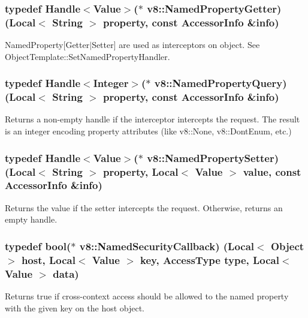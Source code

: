 \subsubsection[{Named\+Property\+Getter}]{\setlength{\rightskip}{0pt plus 5cm}typedef {\bf Handle}$<${\bf Value}$>$($\ast$ v8\+::\+Named\+Property\+Getter) ({\bf Local}$<$ {\bf String} $>$ property, const {\bf Accessor\+Info} \&info)}\label{namespacev8_ab9effde41da1c073eddbd4a11a62bd0b}
Named\+Property\mbox{[}Getter$\vert$\+Setter\mbox{]} are used as interceptors on object. See Object\+Template\+::\+Set\+Named\+Property\+Handler. \hypertarget{namespacev8_a0136e8102c101d9a39497f75daa9153b}{}
\subsubsection[{Named\+Property\+Query}]{\setlength{\rightskip}{0pt plus 5cm}typedef {\bf Handle}$<${\bf Integer}$>$($\ast$ v8\+::\+Named\+Property\+Query) ({\bf Local}$<$ {\bf String} $>$ property, const {\bf Accessor\+Info} \&info)}\label{namespacev8_a0136e8102c101d9a39497f75daa9153b}
Returns a non-\/empty handle if the interceptor intercepts the request. The result is an integer encoding property attributes (like v8\+::\+None, v8\+::\+Dont\+Enum, etc.) \hypertarget{namespacev8_a682b1fc46feab32605c4905612ffe870}{}
\subsubsection[{Named\+Property\+Setter}]{\setlength{\rightskip}{0pt plus 5cm}typedef {\bf Handle}$<${\bf Value}$>$($\ast$ v8\+::\+Named\+Property\+Setter) ({\bf Local}$<$ {\bf String} $>$ property, {\bf Local}$<$ {\bf Value} $>$ value, const {\bf Accessor\+Info} \&info)}\label{namespacev8_a682b1fc46feab32605c4905612ffe870}
Returns the value if the setter intercepts the request. Otherwise, returns an empty handle. \hypertarget{namespacev8_ab5cafda0c556bba990c660ce9c904e0d}{}
\subsubsection[{Named\+Security\+Callback}]{\setlength{\rightskip}{0pt plus 5cm}typedef bool($\ast$ v8\+::\+Named\+Security\+Callback) ({\bf Local}$<$ {\bf Object} $>$ host, {\bf Local}$<$ {\bf Value} $>$ key, {\bf Access\+Type} type, {\bf Local}$<$ {\bf Value} $>$ data)}\label{namespacev8_ab5cafda0c556bba990c660ce9c904e0d}
Returns true if cross-\/context access should be allowed to the named property with the given key on the host object. \hypertarget{namespacev8_a8ce54c75241be41ff6a25e9944eefd2a}{}
